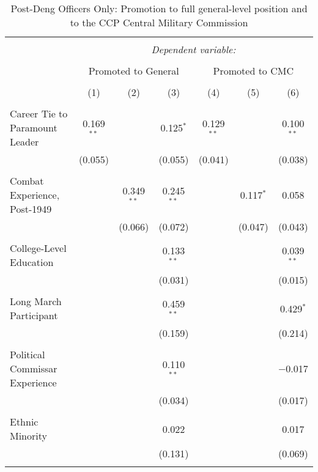 \documentclass[12pt,letterpaper]{article}
\begin{document}
\begin{table}[!htbp] \centering 
	\caption{Post-Deng Officers Only: Promotion to full general-level position and to the CCP Central Military Commission} 
	\label{table_a11} 
	\rmfamily
    \scriptsize
	\begin{tabular}{@{\extracolsep{5pt}}lcccccc} 
		\\[-1.8ex]\hline 
		\hline \\[-1.8ex] 
		& \multicolumn{6}{c}{\textit{Dependent variable:}} \\ 
		\cline{2-7} 
		\\[-1.8ex] & \multicolumn{3}{c}{Promoted to General} & \multicolumn{3}{c}{Promoted to CMC} \\ 
		\\[-1.8ex] & (1) & (2) & (3) & (4) & (5) & (6)\\ 
		\hline \\[-1.8ex] 
		Career Tie to Paramount Leader & 0.169$^{**}$ &  & 0.125$^{*}$ & 0.129$^{**}$ &  & 0.100$^{**}$ \\ 
		& (0.055) &  & (0.055) & (0.041) &  & (0.038) \\ 
		& & & & & & \\ 
		Combat Experience, Post-1949 &  & 0.349$^{**}$ & 0.245$^{**}$ &  & 0.117$^{*}$ & 0.058 \\ 
		&  & (0.066) & (0.072) &  & (0.047) & (0.043) \\ 
		& & & & & & \\ 
		College-Level Education &  &  & 0.133$^{**}$ &  &  & 0.039$^{**}$ \\ 
		&  &  & (0.031) &  &  & (0.015) \\ 
		& & & & & & \\ 
		Long March Participant &  &  & 0.459$^{**}$ &  &  & 0.429$^{*}$ \\ 
		&  &  & (0.159) &  &  & (0.214) \\ 
		& & & & & & \\ 
		Political Commissar Experience &  &  & 0.110$^{**}$ &  &  & $-$0.017 \\ 
		&  &  & (0.034) &  &  & (0.017) \\ 
		& & & & & & \\ 
		Ethnic Minority &  &  & 0.022 &  &  & 0.017 \\ 
		&  &  & (0.131) &  &  & (0.069) \\ 
		& & & & & & \\ 

\end{tabular}
\end{table}
\end{document}
